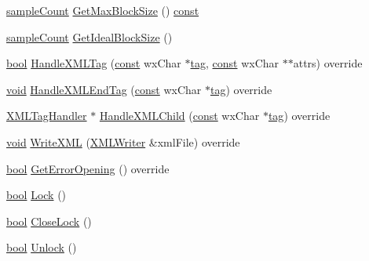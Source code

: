 \begin{DoxyCompactItemize}
\item 
\hyperlink{include_2audacity_2_types_8h_afa427e1f521ea5ec12d054e8bd4d0f71}{sample\+Count} \hyperlink{class_wave_track_a59ca00cf8abf1c28d043effec2866870}{Get\+Max\+Block\+Size} () \hyperlink{getopt1_8c_a2c212835823e3c54a8ab6d95c652660e}{const} 
\item 
\hyperlink{include_2audacity_2_types_8h_afa427e1f521ea5ec12d054e8bd4d0f71}{sample\+Count} \hyperlink{class_wave_track_af1df93d6e053c30b707c53f6d224f104}{Get\+Ideal\+Block\+Size} ()
\item 
\hyperlink{mac_2config_2i386_2lib-src_2libsoxr_2soxr-config_8h_abb452686968e48b67397da5f97445f5b}{bool} \hyperlink{class_wave_track_a8914c769a559d645dbace68f0f56fb8a}{Handle\+X\+M\+L\+Tag} (\hyperlink{getopt1_8c_a2c212835823e3c54a8ab6d95c652660e}{const} wx\+Char $\ast$\hyperlink{structtag}{tag}, \hyperlink{getopt1_8c_a2c212835823e3c54a8ab6d95c652660e}{const} wx\+Char $\ast$$\ast$attrs) override
\item 
\hyperlink{sound_8c_ae35f5844602719cf66324f4de2a658b3}{void} \hyperlink{class_wave_track_ad71b41c39dce899dba1ef7418b2cd54e}{Handle\+X\+M\+L\+End\+Tag} (\hyperlink{getopt1_8c_a2c212835823e3c54a8ab6d95c652660e}{const} wx\+Char $\ast$\hyperlink{structtag}{tag}) override
\item 
\hyperlink{class_x_m_l_tag_handler}{X\+M\+L\+Tag\+Handler} $\ast$ \hyperlink{class_wave_track_a1ccd263058aa228a709301e5c442afe2}{Handle\+X\+M\+L\+Child} (\hyperlink{getopt1_8c_a2c212835823e3c54a8ab6d95c652660e}{const} wx\+Char $\ast$\hyperlink{structtag}{tag}) override
\item 
\hyperlink{sound_8c_ae35f5844602719cf66324f4de2a658b3}{void} \hyperlink{class_wave_track_aebbe78d1db8eb38b330686c799456a0d}{Write\+X\+ML} (\hyperlink{class_x_m_l_writer}{X\+M\+L\+Writer} \&xml\+File) override
\item 
\hyperlink{mac_2config_2i386_2lib-src_2libsoxr_2soxr-config_8h_abb452686968e48b67397da5f97445f5b}{bool} \hyperlink{class_wave_track_a6634d8840f1b87586e594bd628bcd7a5}{Get\+Error\+Opening} () override
\item 
\hyperlink{mac_2config_2i386_2lib-src_2libsoxr_2soxr-config_8h_abb452686968e48b67397da5f97445f5b}{bool} \hyperlink{class_wave_track_af5871fa161f389a2f488857d718ad8fb}{Lock} ()
\item 
\hyperlink{mac_2config_2i386_2lib-src_2libsoxr_2soxr-config_8h_abb452686968e48b67397da5f97445f5b}{bool} \hyperlink{class_wave_track_af7e1d96ef2e79cc51a7bf94c00840dd6}{Close\+Lock} ()
\item 
\hyperlink{mac_2config_2i386_2lib-src_2libsoxr_2soxr-config_8h_abb452686968e48b67397da5f97445f5b}{bool} \hyperlink{class_wave_track_a4302f01c726ed2178ceda8cd7e6c8e5a}{Unlock} ()
$$
\end{DoxyCompactItemize}
